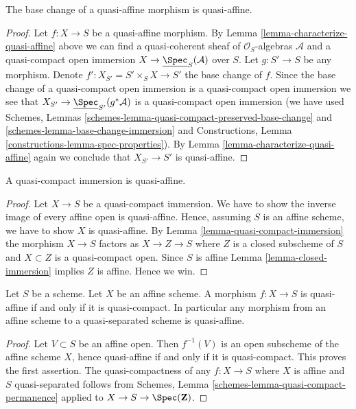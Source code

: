 \begin{lemma}
\label{lemma-base-change-quasi-affine}
The base change of a quasi-affine morphism is quasi-affine.
\end{lemma}

\begin{proof}
Let $f : X \to S$ be a quasi-affine morphism.
By Lemma \ref{lemma-characterize-quasi-affine} above
we can find a quasi-coherent sheaf
of $\mathcal{O}_S$-algebras $\mathcal{A}$ and a quasi-compact
open immersion $X \to \underline{\Spec}_S(\mathcal{A})$
over $S$.
Let $g : S' \to S$ be any morphism.
Denote $f' : X_{S'} = S' \times_S X \to S'$ the base change of $f$.
Since the base change of a quasi-compact open immersion is
a quasi-compact open immersion we see that
$X_{S'} \to \underline{\Spec}_{S'}(g^*\mathcal{A})$
is a quasi-compact open immersion
(we have used Schemes, Lemmas
\ref{schemes-lemma-quasi-compact-preserved-base-change} and
\ref{schemes-lemma-base-change-immersion} and
Constructions, Lemma \ref{constructions-lemma-spec-properties}).
By Lemma \ref{lemma-characterize-quasi-affine} again
we conclude that $X_{S'} \to S'$ is quasi-affine.
\end{proof}

\begin{lemma}
\label{lemma-quasi-compact-immersion-quasi-affine}
A quasi-compact immersion is quasi-affine.
\end{lemma}

\begin{proof}
Let $X \to S$ be a quasi-compact immersion. We have to show the
inverse image of every affine open is quasi-affine. Hence,
assuming $S$ is an affine scheme, we have to show
$X$ is quasi-affine. By Lemma \ref{lemma-quasi-compact-immersion}
the morphism $X \to S$ factors as $X \to Z \to S$ where $Z$ is a closed
subscheme of $S$ and $X \subset Z$ is a quasi-compact open.
Since $S$ is affine Lemma \ref{lemma-closed-immersion} implies
$Z$ is affine. Hence we win.
\end{proof}

\begin{lemma}
\label{lemma-affine-quasi-affine}
Let $S$ be a scheme. Let $X$ be an affine scheme.
A morphism $f : X \to S$ is quasi-affine if and only if it is quasi-compact.
In particular any morphism from an affine scheme to a quasi-separated
scheme is quasi-affine.
\end{lemma}

\begin{proof}
Let $V \subset S$ be an affine open. Then $f^{-1}(V)$ is an open subscheme
of the affine scheme $X$, hence quasi-affine if and only if it is
quasi-compact. This proves the first assertion. The quasi-compactness of any
$f : X \to S$ where $X$ is affine and $S$ quasi-separated follows from
Schemes, Lemma \ref{schemes-lemma-quasi-compact-permanence}
applied to $X \to S \to \Spec(\mathbf{Z})$.
\end{proof}

